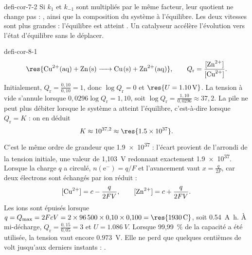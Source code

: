 \begin{blocEdition}{defi-cor-7-2}
\label{figedition-defi-cor-7-2-1}
Si $k_1$ et $k_{-1}$ sont multipliés par le même facteur, leur quotient ne change pas : , ainsi que
la composition du système à l'équilibre. Les deux vitesses sont plus grandes : l'équilibre est atteint
. Un catalyseur accélère l'évolution vers l'état d'équilibre sans le déplacer.
\end{blocEdition}

\begin{blocEdition}{defi-cor-8-1}
\[\res{\ce{Cu^2+(aq) + Zn(s) -> Cu(s) + Zn^2+(aq)}},\qquad Q_\mathrm{r}=\frac{[\ce{Zn^2+}]}{[\ce{Cu^2+}]}.\]
Initialement, $Q_\mathrm{r}=\frac{0{,}10}{0{,}10}=1$, donc $\log Q_\mathrm{r}=0$ et $\res{U=\qty{1,10}{V}}$.
La tension à vide s'annule lorsque $0{,}0296\log Q_\mathrm{r}=1{,}10$, soit $\log Q_\mathrm{r}=\frac{1{,}10}{0{,}0296}\approx37{,}2$. La
pile ne peut plus débiter lorsque le système a atteint l'équilibre, c'est-à-dire lorsque $Q_\mathrm{r}=K$ : on en déduit
\[K\approx10^{37{,}2}\approx\res{\num{1.5e37}}.\]
C'est le même ordre de grandeur que \num{1.9e37} : l'écart provient de l'arrondi de la tension initiale, une valeur de
1,103~V redonnant exactement \num{1.9e37}.
Lorsque la charge $q$ a circulé, $n(\mathrm{e}^-)=q/F$ et l'avancement vaut $x=\frac{q}{2F}$, car deux électrons sont
échangés par ion  réduit :
\[[\ce{Cu^2+}]=c-\frac{q}{2FV},\qquad[\ce{Zn^2+}]=c+\frac{q}{2FV}.\]
Les ions  sont épuisés lorsque $q=Q_{\max}=2FcV=2\times\num{96500}\times0{,}10\times0{,}100=\res{\qty{1930}{C}}$,
soit \qty{0,54}{A.h}.
À mi-décharge, $Q_\mathrm{r}=\frac{0{,}15}{0{,}05}=3$ et $U=\qty{1,086}{V}$. Lorsque 99,99~\% de la capacité a été utilisée,
la tension vaut encore \qty{0,973}{V}. Elle ne perd que quelques centièmes de volt jusqu'aux derniers instants :
.
\end{blocEdition}

